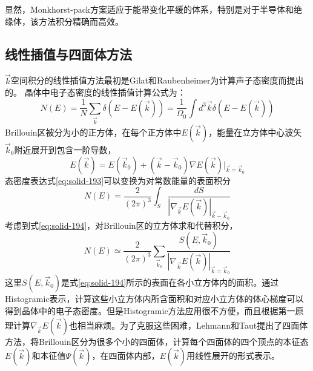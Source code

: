 显然，\textrm{Monkhorst-pack}方案适应于能带变化平缓的体系，特别是对于半导体和绝缘体，该方法积分精确而高效。%



\subsection{线性插值与四面体方法}\label{Tetrahedron-Quadratic}
$\vec k$空间积分的线性插值方法最初是\textrm{Gilat}和\textrm{Raubenheimer}\cite{PR144-390_1966}为计算声子态密度而提出的。
晶体中电子态密度的线性插值计算公式为：
\begin{equation}
  N(E)=\frac1N\sum_{\vec k}\delta(E-E(\vec k))=\frac1{\Omega_0}\int d^3\vec k\delta(E-E(\vec k)) 
  \label{eq:solid-193}
\end{equation}
\textrm{Brillouin}区被分为小的正方体，在每个正方体中$E(\vec k)$，能量在立方体中心波矢$\vec k_0$附近展开到包含一阶导数，
\begin{equation}
  E(\vec k)=E(\vec k_0)+(\vec k-\vec k_0)\nabla E(\vec k)|_{\vec k=\vec k_0}
  \label{eq:solid-194}
\end{equation}
态密度表达式\eqref{eq:solid-193}可以变换为对常数能量的表面积分
\begin{equation}
  N(E)=\frac2{(2\pi)^3}\int_S\frac{dS}{|\nabla_{\vec k}E(\vec k)|_{\vec k-\vec k_0}}
  \label{eq:solid-195}
\end{equation}
考虑到式\eqref{eq:solid-194}，对Brillouin区的立方体求和代替积分，
\begin{equation}
  N(E)\simeq\frac2{(2\pi)^3}\sum_{\vec k_0}\frac{S(E,\vec k_0)}{|\nabla_{\vec k}E(\vec k)|_{\vec k=\vec k_0}}
  \label{eq:solid-196}
\end{equation}
这里$S(E,\vec k_0)$是式\eqref{eq:solid-194}所示的表面在各小立方体内的面积。通过Histogramic表示，计算这些小立方体内所含面积和对应小立方体的体心梯度可以得到晶体中的电子态密度。但是Histogramic方法应用很不方便，而且根据第一原理计算$\nabla_{\vec k}E(\vec k)$也相当麻烦。为了克服这些困难，Lehmann和Taut提出了四面体方法\cite{PSSB54-469_1972}，将Brillouin区分为很多个小的四面体，计算每个四面体的四个顶点的本征态$E(\vec k)$和本征值$\Psi(\vec k)$，在四面体内部，$E(\vec k)$用线性展开的形式表示。


